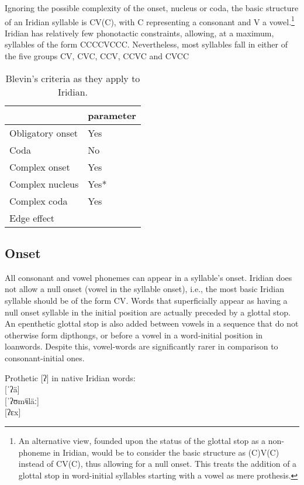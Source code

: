 Ignoring the possible complexity of the onset, nucleus or coda, the basic structure of an Iridian syllable is CV(C), with C representing a consonant and V a vowel.\footnote{An alternative view, founded upon the status of the glottal stop as a non-phoneme in Iridian, would be to consider the basic structure as (C)V(C) instead of CV(C), thus allowing for a null onset. This treats the addition of a glottal stop in word-initial syllables starting with a vowel as mere prothesis.} Iridian has relatively few phonotactic constraints, allowing, at a maximum, syllables of the form CCCCVCCC. Nevertheless, most syllables fall in either of the five groups CV, CVC, CCV, CCVC and CVCC

\begin{table}[h!]
	\small
	\caption{Blevin's criteria as they apply to Iridian.}
	\medskip
	\begin{tabularx}{0.6\textwidth}{@{}YM@{}}
		\toprule
		& {\sc parameter}\\
		\midrule
		Obligatory onset & Yes\\
		Coda & No\\
		Complex onset & Yes\\
		Complex nucleus & Yes*\\
		Complex coda & Yes\\
		Edge effect & \\
		\bottomrule
	\end{tabularx}
\end{table}


\subsection{Onset}

\par All consonant and vowel phonemes can appear in a syllable's onset. Iridian does not allow a null onset (vowel in the syllable onset), i.e., the most basic Iridian syllable should be of the form CV. Words that superficially appear as having a null onset syllable in the initial position are actually preceded by a glottal stop. An epenthetic glottal stop is also added between vowels in a sequence that do not otherwise form dipthongs, or before a vowel in a word-initial position in loanwords. Despite this, vowel-words are significantly rarer in comparison to consonant-initial ones.

\ex
Prothetic [ʔ] in native Iridian words:\\
 [ˈʔä]\\
 [ˈʔʊmʲɨläː]\\
 [ʔɛx]
\xe

